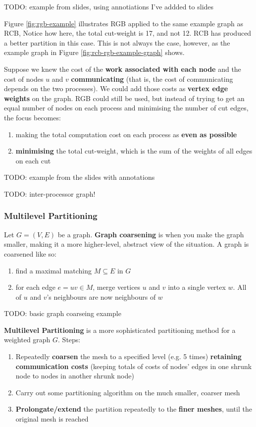 \documentclass{article}
\begin{document}
TODO: example from slides, using annotiations I've addded to slides

Figure \ref{fig:rgb-example} illustrates RGB applied to the same example graph as RCB, Notice how here, the total cut-weight is 17, and not 12. RCB has produced a better partition in this case. This is not always the case, however, as the example graph in Figure \ref{fig:rcb-rgb-example-graph} shows.

Suppose we knew the cost of the \textbf{work associated with each node} and the cost of nodes $u$ and $v$ \textbf{communicating} (that is, the cost of communicating depends on the two processes). We could add those costs as \textbf{vertex edge weights} on the graph. RGB could still be used, but instead of trying to get an equal number of nodes on each process and minimising the number of cut edges, the focus becomes:
\begin{enumerate}
	\item making the total computation cost on each process as \textbf{even as possible}
	\item \textbf{minimising} the total cut-weight, which is the sum of the weights of all edges on each cut
\end{enumerate}

TODO: example from the slides with annotations

TODO: inter-processor graph!

\subsubsection{Multilevel Partitioning}

Let $G = (V, E)$ be a graph. \textbf{Graph coarsening} is when you make the graph smaller, making it a more higher-level, abstract view of the situation. A graph is coarsened like so:
\begin{enumerate}
	\item find a maximal matching $M \subseteq E$ in $G$
	\item for each edge $e = uv \in M$, merge vertices $u$ and $v$ into a single vertex $w$. All of $u$ and $v$'s neighbours are now neighbours of $w$
\end{enumerate}

TODO: basic graph coarseing example

\textbf{Multilevel Partitioning} is a more sophisticated partitioning method for a weighted graph $G$. Steps:
\begin{enumerate}
	\item Repeatedly \textbf{coarsen} the mesh to a specified level (e.g. 5 times) \textbf{retaining communication costs} (keeping totals of costs of nodes' edges in one shrunk node to nodes in another shrunk node)
	\item Carry out some partitioning algorithm on the much smaller, coarser mesh
	\item \textbf{Prolongate/extend} the partition repeatedly to the \textbf{finer meshes}, until the original mesh is reached
\end{enumerate}
\end{document}
